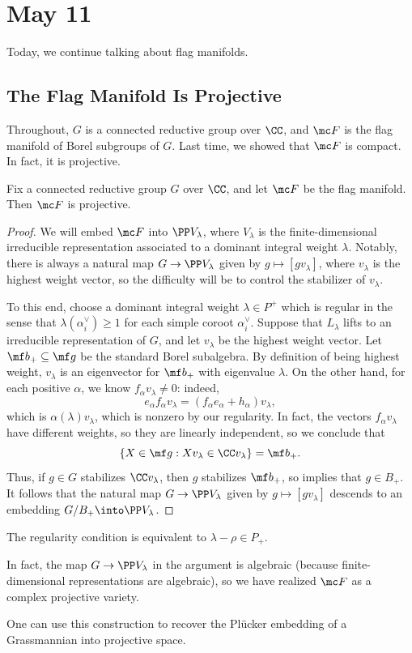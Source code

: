 \documentclass[../notes.tex]{subfiles}
\begin{document}
\section{May 11}
Today, we continue talking about flag manifolds.

\subsection{The Flag Manifold Is Projective}
Throughout, $G$ is a connected reductive group over $\CC$, and $\mc F$ is the flag manifold of Borel subgroups of $G$. Last time, we showed that $\mc F$ is compact. In fact, it is projective.
\begin{proposition} \label{prop:flag-proj}
	Fix a connected reductive group $G$ over $\CC$, and let $\mc F$ be the flag manifold. Then $\mc F$ is projective.
\end{proposition}
\begin{proof}
	We will embed $\mc F$ into $\PP V_\lambda$, where $V_\lambda$ is the finite-dimensional irreducible representation associated to a dominant integral weight $\lambda$. Notably, there is always a natural map $G\to\PP V_\lambda$ given by $g\mapsto[gv_\lambda]$, where $v_\lambda$ is the highest weight vector, so the difficulty will be to control the stabilizer of $v_\lambda$.
	
	To this end, choose a dominant integral weight $\lambda\in P^+$ which is regular in the sense that $\lambda(\alpha_i^\lor)\ge1$ for each simple coroot $\alpha_i^\lor$. Suppose that $L_\lambda$ lifts to an irreducible representation of $G$, and let $v_\lambda$ be the highest weight vector. Let $\mf b_+\subseteq\mf g$ be the standard Borel subalgebra. By definition of being highest weight, $v_\lambda$ is an eigenvector for $\mf b_+$ with eigenvalue $\lambda$. On the other hand, for each positive $\alpha$, we know $f_\alpha v_\lambda\ne0$: indeed,
	\[e_\alpha f_\alpha v_\lambda=(f_\alpha e_\alpha+h_\alpha)v_\lambda,\]
	which is $\alpha(\lambda)v_\lambda$, which is nonzero by our regularity. In fact, the vectors $f_\alpha v_\lambda$ have different weights, so they are linearly independent, so we conclude that
	\[\{X\in\mf g:Xv_\lambda\in\CC v_\lambda\}=\mf b_+.\]
	Thus, if $g\in G$ stabilizes $\CC v_\lambda$, then $g$ stabilizes $\mf b_+$, so  implies that $g\in B_+$. It follows that the natural map $G\to\PP V_\lambda$ given by $g\mapsto[gv_\lambda]$ descends to an embedding $G/B_+\into\PP V_\lambda$.
\end{proof}
\begin{remark}
	The regularity condition is equivalent to $\lambda-\rho\in P_+$.
\end{remark}
\begin{remark}
	In fact, the map $G\to\PP V_\lambda$ in the argument is algebraic (because finite-dimensional representations are algebraic), so we have realized $\mc F$ as a complex projective variety.
\end{remark}
\begin{example}
	One can use this construction to recover the Pl\"ucker embedding of a Grassmannian into projective space.
\end{example}
\end{document}
